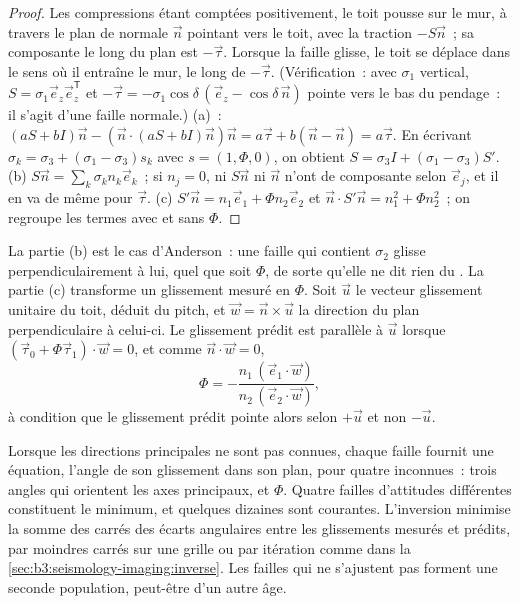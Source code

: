 \begin{proof}
Les compressions étant comptées positivement, le toit pousse sur le mur, à travers le
plan de normale $\vec n$ pointant vers le toit, avec la
traction $-S\vec n$~; sa composante le long du plan est $-\vec\tau$. Lorsque la
faille glisse, le toit se déplace dans le sens où il entraîne le mur, le long de
$-\vec\tau$. (Vérification~: avec $\sigma_1$ vertical, $S = \sigma_1\vec e_z\vec
e_z^{\mathsf T}$ et $-\vec\tau = -\sigma_1\cos\delta\,(\vec e_z -
\cos\delta\,\vec n)$ pointe vers le bas du pendage~: il s'agit d'une faille normale.)
(a)~: $(aS + bI)\vec n - (\vec n\cdot(aS + bI)\vec n)\vec n = a\vec\tau + b(\vec
n - \vec n) = a\vec\tau$. En écrivant $\sigma_k = \sigma_3 + (\sigma_1 -
\sigma_3)s_k$ avec $s = (1, \Phi, 0)$, on obtient $S = \sigma_3 I + (\sigma_1 -
\sigma_3)S'$.
(b) $S\vec n = \sum_k\sigma_kn_k\vec e_k$~; si $n_j = 0$, ni $S\vec n$
ni $\vec n$ n'ont de composante selon $\vec e_j$, et il en va de même pour $\vec\tau$.
(c) $S'\vec n = n_1\vec e_1 + \Phi n_2\vec e_2$ et $\vec n\cdot S'\vec n =
n_1^2 + \Phi n_2^2$~; on regroupe les termes avec et sans $\Phi$.
\end{proof}

La partie (b) est le cas d'Anderson~: une faille qui contient $\sigma_2$ glisse
perpendiculairement à lui, quel que soit $\Phi$, de sorte qu'elle ne dit rien du
. La partie (c) transforme un glissement mesuré en $\Phi$. Soit $\vec u$ le
vecteur glissement unitaire du toit, déduit du pitch, et $\vec w = \vec n\times\vec
u$ la direction du plan perpendiculaire à celui-ci. Le glissement prédit est
parallèle à $\vec u$ lorsque $(\vec\tau_0 + \Phi\vec\tau_1)\cdot\vec w = 0$, et
comme $\vec n\cdot\vec w = 0$,
\[
  \Phi = -\frac{n_1\,(\vec e_1\cdot\vec w)}{n_2\,(\vec e_2\cdot\vec w)} ,
\]
à condition que le glissement prédit pointe alors selon $+\vec u$ et non $-\vec u$.

Lorsque les directions principales ne sont pas connues, chaque faille fournit une équation,
l'angle de son glissement dans son plan, pour quatre inconnues~: trois angles qui
orientent les axes principaux, et $\Phi$. Quatre failles d'attitudes différentes constituent
le minimum, et quelques dizaines sont courantes. L'inversion minimise la somme des
carrés des écarts angulaires entre les glissements mesurés et prédits, par moindres carrés
sur une grille ou par itération comme dans la \cref{sec:b3:seismology-imaging:inverse}.
Les failles qui ne s'ajustent pas forment une seconde population, peut-être d'un autre âge.

